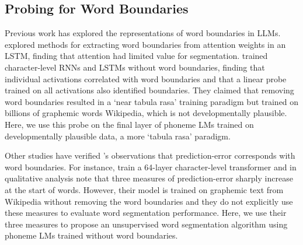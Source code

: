 

\subsection{Probing for Word Boundaries}


Previous work has explored the representations of word boundaries in LLMs. \citet{sanabria2021difficulty} explored methods for extracting word boundaries from attention weights in an LSTM, finding that attention had limited value for segmentation. \citet{hahn-baroni-2019-tabula} trained character-level RNNs and LSTMs without word boundaries, finding that individual activations correlated with word boundaries and that a linear probe trained on all activations also identified boundaries. They claimed that removing word boundaries resulted in a `near tabula rasa' training paradigm but trained on billions of graphemic words Wikipedia, which is not developmentally plausible. Here, we use this probe on the final layer of phoneme LMs trained on developmentally plausible data, a more `tabula rasa' paradigm. 

Other studies have verified \citeauthor{elman-1990-finding}'s observations that prediction-error corresponds with word boundaries. For instance, \citet{al-rfou_character-level_2019} train a 64-layer character-level transformer and in qualitative analysis note that three measures of prediction-error sharply increase at the start of words. However, their model is trained on graphemic text from Wikipedia without removing the word boundaries and they do not explicitly use these measures to evaluate word segmentation performance. Here, we use their three measures to propose an unsupervised word segmentation algorithm using phoneme LMs trained without word boundaries.

